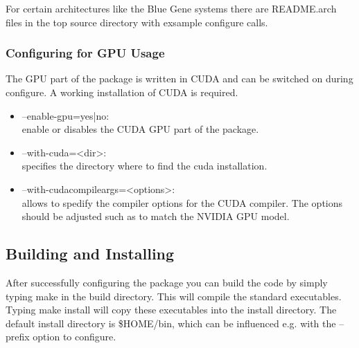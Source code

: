 For certain architectures like the Blue Gene systems there are
{\ttfamily README.arch} files in the top source directory with
exsample configure calls.

\subsubsection{Configuring for GPU Usage}

The GPU part of the package is written in CUDA and can be switched on
during configure. A working installation of CUDA is required.

\begin{itemize}
\item {\ttfamily --enable-gpu=yes|no}:\\
  enable or disables the CUDA GPU part of the package.

\item {\ttfamily --with-cuda=<dir>}:\\
  specifies the directory where to find the cuda installation.

\item {\ttfamily --with-cudacompileargs=<options>}:\\
  allows to spedify the compiler options for the CUDA compiler. The
  options should be adjusted such as to match the NVIDIA GPU model.
\end{itemize}


\subsection{Building and Installing}

After successfully configuring the package you can build the code by
simply typing {\ttfamily make} in the build directory. This will
compile the standard executables. Typing {\ttfamily make install} will
copy these executables into the install directory. The default install
directory is {\ttfamily \$HOME/bin}, which can be influenced e.g. with
the {\ttfamily --prefix} option to {\ttfamily configure}. 


